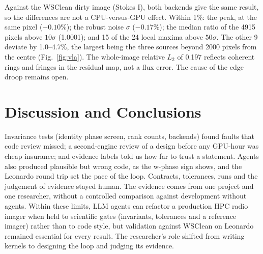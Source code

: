 \documentclass[11pt,twoside]{article}
\begin{document}
Against the WSClean dirty image (Stokes I), both backends give the same
result, so the differences are not a CPU-versus-GPU effect. Within 1\%: the
peak, at the same pixel ($-0.10\%$); the robust noise $\sigma$ ($-0.17\%$); the
median ratio of the 4915 pixels above $10\sigma$ (1.0001); and 15 of the 24
local maxima above $50\sigma$. The other 9 deviate by 1.0--4.7\%, the largest
being the three sources beyond 2000 pixels from the centre
(Fig.~\ref{fig:vla}). The whole-image relative $L_2$ of 0.197 reflects coherent
rings and fringes in the residual map, not a flux error. The cause of the
edge droop remains open.


\section{Discussion and Conclusions}

Invariance tests (identity phase screen, rank counts, backends) found faults
that code review missed; a second-engine review of a design before any
GPU-hour was cheap insurance; and evidence labels told us how far to trust a
statement. Agents also produced plausible but wrong code, as the w-phase sign
shows, and the Leonardo round trip set the pace of the loop. Contracts,
tolerances, runs and the judgement of evidence stayed human. The evidence
comes from one project and one researcher, without a controlled comparison
against development without agents. Within these limits, LLM agents can
refactor a production HPC radio imager when held to scientific gates
(invariants, tolerances and a reference imager) rather than to code style, but
validation against WSClean on Leonardo remained essential for every result. The researcher's role shifted from writing kernels to designing the
loop and judging its evidence.



\end{document}
